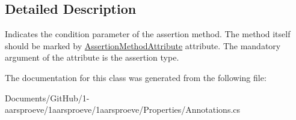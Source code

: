 \subsection{Detailed Description}
Indicates the condition parameter of the assertion method. The method itself should be marked by \hyperlink{class_assertion_method_attribute}{Assertion\+Method\+Attribute} attribute. The mandatory argument of the attribute is the assertion type. 



The documentation for this class was generated from the following file\+:\begin{DoxyCompactItemize}
\item 
Documents/\+Git\+Hub/1-\/aarsproeve/1aarsproeve/1aarsproeve/\+Properties/Annotations.\+cs\end{DoxyCompactItemize}
